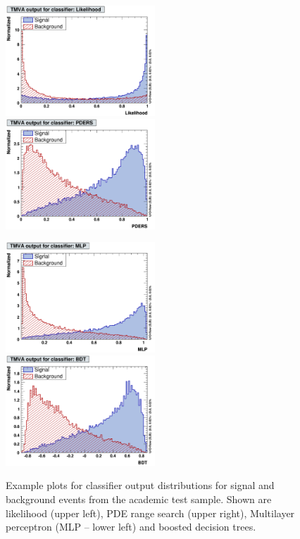 \begin{figure}[t]
\begin{center}
  \includegraphics[width=0.50\textwidth]{plots/MVA-Likelihood}
  \hspace{-0.3cm}
  \includegraphics[width=0.50\textwidth]{plots/MVA-PDERS}

  \vspace{0.2cm}

  \includegraphics[width=0.50\textwidth]{plots/MVA-MLP}
  \hspace{-0.3cm}
  \includegraphics[width=0.50\textwidth]{plots/MVA-BDT}
\end{center}
\vspace{-0.5cm}
\caption[.]{Example plots for classifier output distributions for signal and 
            background events from the academic test sample. Shown are
            likelihood (upper left), PDE range search
            (upper right), Multilayer perceptron (MLP -- lower left) and boosted decision trees.}
\label{fig:usingtmva:mvas}
\end{figure}
